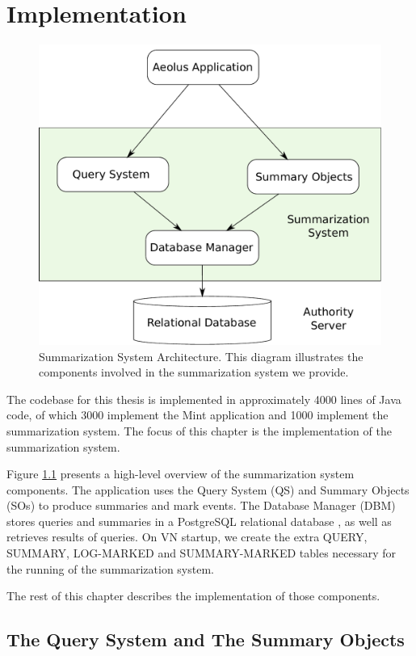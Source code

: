 \chapter{Implementation}

\begin{figure}[h]
\centering
\includegraphics[width=.8\textwidth,keepaspectratio]{figures/impl-sysarch}
\caption[Summarization System Architecture]{Summarization System Architecture. This diagram illustrates the components involved in the summarization system we provide.}
\label{fig:impl-sysarch}
\end{figure}

The codebase for this thesis is implemented in approximately 4000 lines of Java code, of which 3000 implement the Mint application and 1000 implement the summarization system. The focus of this chapter is the implementation of the summarization system.

Figure \ref{fig:impl-sysarch} presents a high-level overview of the summarization system components. The application uses the Query System (QS) and Summary Objects (SOs) to produce summaries and mark events. The Database Manager (DBM) stores queries and summaries in a PostgreSQL relational database \cite{pgsql-gen}, as well as retrieves results of queries. On VN startup, we create the extra QUERY, SUMMARY, LOG-MARKED and SUMMARY-MARKED tables necessary for the running of the summarization system.

The rest of this chapter describes the implementation of those components.

\section{The Query System and The Summary Objects}

